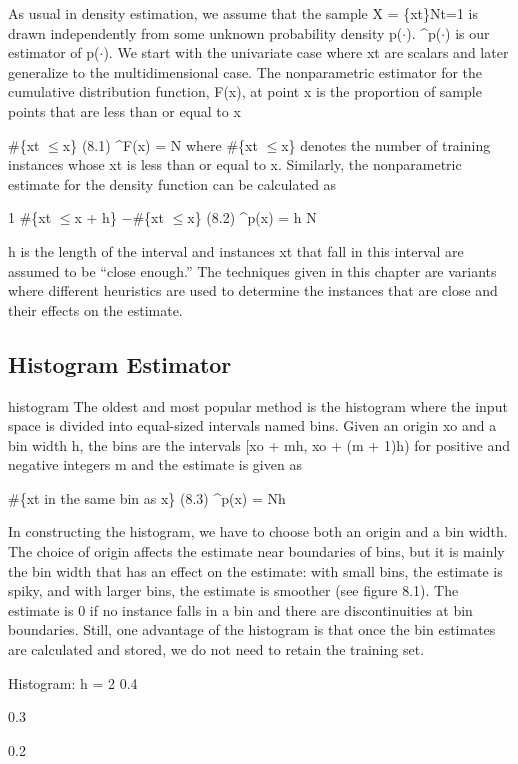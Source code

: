 As usual in density estimation, we assume that the sample X = \{xt\}Nt=1 is drawn independently from some unknown probability density p($\cdot$). \textasciicircum{}p($\cdot$) is our estimator of p($\cdot$). We start with the univariate case where xt are scalars and later generalize to the multidimensional case. The nonparametric estimator for the cumulative distribution function, F(x), at point x is the proportion of sample points that are less than or equal to x

\#\{xt $\leq$x\} (8.1) \textasciicircum{}F(x) = N where \#\{xt $\leq$x\} denotes the number of training instances whose xt is less than or equal to x. Similarly, the nonparametric estimate for the density function can be calculated as

1 \#\{xt $\leq$x + h\} $-$\#\{xt $\leq$x\} (8.2) \textasciicircum{}p(x) = h N

h is the length of the interval and instances xt that fall in this interval are assumed to be “close enough.” The techniques given in this chapter are variants where different heuristics are used to determine the instances that are close and their effects on the estimate.

\subsection{Histogram Estimator}

histogram The oldest and most popular method is the histogram where the input space is divided into equal-sized intervals named bins. Given an origin xo and a bin width h, the bins are the intervals [xo + mh, xo + (m + 1)h) for positive and negative integers m and the estimate is given as

\#\{xt in the same bin as x\} (8.3) \textasciicircum{}p(x) = Nh

In constructing the histogram, we have to choose both an origin and a bin width. The choice of origin affects the estimate near boundaries of bins, but it is mainly the bin width that has an effect on the estimate: with small bins, the estimate is spiky, and with larger bins, the estimate is smoother (see figure 8.1). The estimate is 0 if no instance falls in a bin and there are discontinuities at bin boundaries. Still, one advantage of the histogram is that once the bin estimates are calculated and stored, we do not need to retain the training set.

Histogram: h = 2 0.4

0.3

0.2

